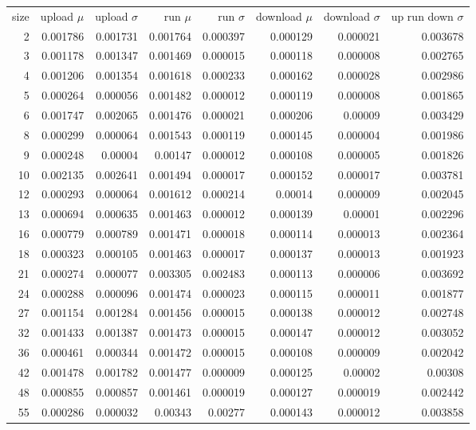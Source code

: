 \begin{longtable}{r r r r r r r r}
size & upload $\mu$  & upload $\sigma$ & run $\mu$ & run $\sigma$ & download $\mu$ & download $\sigma$ & up run down $\sigma$ \\
2 & 0.001786 & 0.001731 & 0.001764 & 0.000397 & 0.000129 & 0.000021 & 0.003678 \\
3 & 0.001178 & 0.001347 & 0.001469 & 0.000015 & 0.000118 & 0.000008 & 0.002765 \\
4 & 0.001206 & 0.001354 & 0.001618 & 0.000233 & 0.000162 & 0.000028 & 0.002986 \\
5 & 0.000264 & 0.000056 & 0.001482 & 0.000012 & 0.000119 & 0.000008 & 0.001865 \\
6 & 0.001747 & 0.002065 & 0.001476 & 0.000021 & 0.000206 & 0.00009 & 0.003429 \\
8 & 0.000299 & 0.000064 & 0.001543 & 0.000119 & 0.000145 & 0.000004 & 0.001986 \\
9 & 0.000248 & 0.00004 & 0.00147 & 0.000012 & 0.000108 & 0.000005 & 0.001826 \\
10 & 0.002135 & 0.002641 & 0.001494 & 0.000017 & 0.000152 & 0.000017 & 0.003781 \\
12 & 0.000293 & 0.000064 & 0.001612 & 0.000214 & 0.00014 & 0.000009 & 0.002045 \\
13 & 0.000694 & 0.000635 & 0.001463 & 0.000012 & 0.000139 & 0.00001 & 0.002296 \\
16 & 0.000779 & 0.000789 & 0.001471 & 0.000018 & 0.000114 & 0.000013 & 0.002364 \\
18 & 0.000323 & 0.000105 & 0.001463 & 0.000017 & 0.000137 & 0.000013 & 0.001923 \\
21 & 0.000274 & 0.000077 & 0.003305 & 0.002483 & 0.000113 & 0.000006 & 0.003692 \\
24 & 0.000288 & 0.000096 & 0.001474 & 0.000023 & 0.000115 & 0.000011 & 0.001877 \\
27 & 0.001154 & 0.001284 & 0.001456 & 0.000015 & 0.000138 & 0.000012 & 0.002748 \\
32 & 0.001433 & 0.001387 & 0.001473 & 0.000015 & 0.000147 & 0.000012 & 0.003052 \\
36 & 0.000461 & 0.000344 & 0.001472 & 0.000015 & 0.000108 & 0.000009 & 0.002042 \\
42 & 0.001478 & 0.001782 & 0.001477 & 0.000009 & 0.000125 & 0.00002 & 0.00308 \\
48 & 0.000855 & 0.000857 & 0.001461 & 0.000019 & 0.000127 & 0.000019 & 0.002442 \\
55 & 0.000286 & 0.000032 & 0.00343 & 0.00277 & 0.000143 & 0.000012 & 0.003858 \\

\end{longtable}
